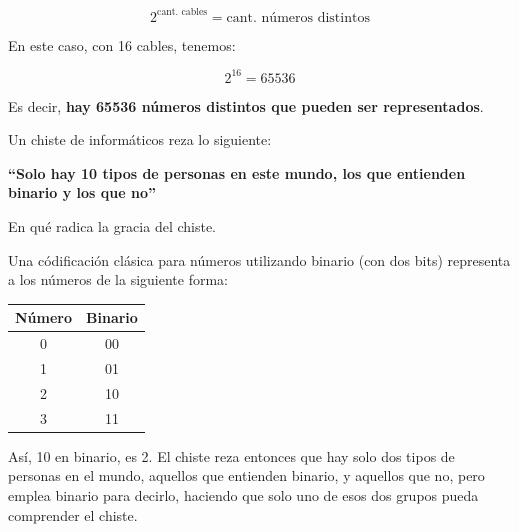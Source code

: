 \begin{equation}
    2^{\text{cant. cables}} = \text{cant. números distintos}
\end{equation}

En este caso, con 16 cables, tenemos:

\begin{equation}
    2^16 = 65536
\end{equation}

Es decir, \textbf{hay 65536 números distintos que pueden ser representados}.
\vspace{1cm}

\begin{exercise}
Un chiste de informáticos reza lo siguiente:

\textbf{``Solo hay 10 tipos de personas en este mundo, los que entienden binario
y los que no''}

En qué radica la gracia del chiste.
\end{exercise}

Una códificación clásica para números utilizando binario (con dos bits)
representa a los números de la siguiente forma:

\vspace{0.3cm}
\begin{tabular}{c | c}
    Número & Binario \\
    \hline
    0 & 00 \\
    1 & 01 \\
    2 & 10 \\
    3 & 11 \\
\end{tabular}
\vspace{0.3cm}

Así, 10 en binario, es 2. El chiste reza entonces que hay solo dos tipos de
personas en el mundo, aquellos que entienden binario, y aquellos que no, pero
emplea binario para decirlo, haciendo que solo uno de esos dos grupos pueda
comprender el chiste.
